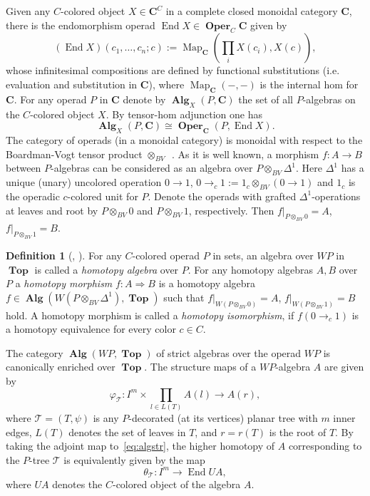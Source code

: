 \documentclass{amsart}
\theoremstyle{definition}
\newtheorem{definition}[formula]{Definition}
\theoremstyle{remark}
\newcommand{\Cc}{\mathbf{C}}
\DeclareMathOperator{\Top}{\mathbf{Top}}
\DeclareMathOperator{\Oper}{\mathbf{Oper}}
\DeclareMathOperator{\Map}{Map}
\DeclareMathOperator{\Alg}{\mathbf{Alg}}
\DeclareMathOperator{\End}{End}
\renewcommand{\phi}{\varphi}
\begin{document}
	Given any $C$-colored object $X\in \Cc^{C}$ in a complete closed monoidal category $\Cc$, there is the endomorphism operad $\End X\in \Oper_{C} \Cc$ given by
	\[
	(\End X)(c_{1},\dots,c_{n};c):=
	\Map_\Cc(\prod_{i} X(c_{i}),X(c)),
	\]
	whose infinitesimal compositions are defined by functional substitutions (i.e. evaluation and substitution in $\Cc$), where $\Map_\Cc(-,-)$ is the internal hom for $\Cc$.
	For any operad $P$ in $\Cc$ denote by $\Alg_{X}(P,\Cc)$ the set of all $P$-algebras on the $C$-colored object $X$.
	By tensor-hom adjunction one has
	\begin{equation}\label{eq:algoper}
		\Alg_{X}(P,\Cc)\cong \Oper_{\Cc}(P,\End X).
	\end{equation}
	The category of operads (in a monoidal category) is monoidal with respect to the Boardman-Vogt tensor product $\otimes_{BV}$~\cite{be-mo-06'}.
	As it is well known, a morphism $f\colon A\to B$ between $P$-algebras can be considered as an algebra over $P\otimes_{BV}\Delta^{1}$.
	Here $\Delta^{1}$ has a unique (unary) uncolored operation $0\to 1$, $0\to_{c} 1:=1_{c}\otimes_{BV} (0\to 1)$ and $1_{c}$ is the operadic $c$-colored unit for $P$.
	Denote the operads with grafted $\Delta^{1}$-operations at leaves and root by $P\otimes_{BV} 0$ and $P\otimes_{BV} 1$, respectively.
	Then $f|_{P\otimes_{BV} 0}=A$, $f|_{P\otimes_{BV} 1}=B$.
	
	\begin{definition}[{\cite[Ch.~4]{we-07}, \cite[\S2.9]{ma-sh-st-00}}]
		For any $C$-colored operad $P$ in sets, an algebra over $WP$ in $\Top$ is called a \textit{homotopy algebra} over $P$.
		For any homotopy algebras $A,B$ over $P$ a \textit{homotopy morphism} $f\colon A\Rightarrow B$ is a homotopy algebra $f\in \Alg(W(P\otimes_{BV}\Delta^{1}),\Top)$ such that 
		$f|_{W(P\otimes_{BV} 0)}=A$, $f|_{W(P\otimes_{BV} 1)}=B$ hold.
		A homotopy morphism is called a \textit{homotopy isomorphism}, if $f(0\to_{c} 1)$ is a homotopy equivalence for every color $c\in C$.
	\end{definition}
	
	The category $\Alg(WP,\Top)$ of strict algebras over the operad $WP$ is canonically enriched over $\Top$.
	The structure maps of a $WP$-algebra $A$ are given by 
	\begin{equation}\label{eq:algstr}
		\phi_{\mathcal{T}}\colon I^{m}\times \prod_{l\in L(T)}A(l)\to A(r),
	\end{equation}
	where $\mathcal{T}=(T,\psi)$ is any $P$-decorated (at its vertices) planar tree with $m$ inner edges, $L(T)$ denotes the set of leaves in $T$, and $r=r(T)$ is the root of $T$.
	By taking the adjoint map to~\eqref{eq:algstr}, the higher homotopy of $A$ corresponding to the $P$-tree $\mathcal{T}$ is equivalently given by the map
	\begin{equation}\label{eq:thetamap}
		\theta_{\mathcal{T}}\colon I^{m}\to \End UA,
	\end{equation}
	where $UA$ denotes the $C$-colored object of the algebra $A$.
	
\end{document}
